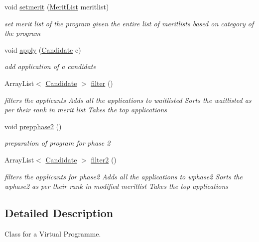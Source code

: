 \begin{DoxyCompactItemize}
void \hyperlink{classalgo1_1_1VirtualProgramme_a1d6ad057cdf7e5e12a8fe82b4457a3d1}{setmerit} (\hyperlink{classalgo1_1_1MeritList}{Merit\+List} meritlist)
\begin{DoxyCompactList}\small\item\em set merit list of the program given the entire list of meritlists based on category of the program \end{DoxyCompactList}\item 
void \hyperlink{classalgo1_1_1VirtualProgramme_a08db91731dbba1d015a197594d31a908}{apply} (\hyperlink{classalgo1_1_1Candidate}{Candidate} c)
\begin{DoxyCompactList}\small\item\em add application of a candidate \end{DoxyCompactList}\item 
Array\+List$<$ \hyperlink{classalgo1_1_1Candidate}{Candidate} $>$ \hyperlink{classalgo1_1_1VirtualProgramme_acf0659ed464ce011568c9722fd72ea6f}{filter} ()
\begin{DoxyCompactList}\small\item\em filters the applicants Adds all the applications to waitlisted Sorts the waitlisted as per their rank in merit list Takes the top applications \end{DoxyCompactList}\item 
\hypertarget{classalgo1_1_1VirtualProgramme_aaae450c00ea65274f5904f4f6436244a}{void \hyperlink{classalgo1_1_1VirtualProgramme_aaae450c00ea65274f5904f4f6436244a}{prepphase2} ()}\label{classalgo1_1_1VirtualProgramme_aaae450c00ea65274f5904f4f6436244a}

\begin{DoxyCompactList}\small\item\em preparation of program for phase 2 \end{DoxyCompactList}\item 
Array\+List$<$ \hyperlink{classalgo1_1_1Candidate}{Candidate} $>$ \hyperlink{classalgo1_1_1VirtualProgramme_a14af298ca135c234a3084ee0754179ad}{filter2} ()
\begin{DoxyCompactList}\small\item\em filters the applicants for phase2 Adds all the applications to wphase2 Sorts the wphase2 as per their rank in modified meritlist Takes the top applications \end{DoxyCompactList}\end{DoxyCompactItemize}


\subsection{Detailed Description}
Class for a Virtual Programme. 

